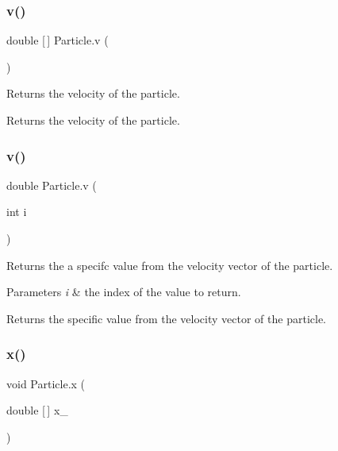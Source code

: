 \subsubsection{\texorpdfstring{v()}{v()}\hspace{0.1cm}{\footnotesize\ttfamily [2/3]}}
{\footnotesize\ttfamily double \mbox{[}$\,$\mbox{]} Particle.\+v (\begin{DoxyParamCaption}{ }\end{DoxyParamCaption})}

Returns the velocity of the particle. \begin{DoxyReturn}{Returns}
the velocity of the particle. 
\end{DoxyReturn}
\mbox{\label{class_particle_aa7e430520821b6650d829f3b51752d01}} 
\subsubsection{\texorpdfstring{v()}{v()}\hspace{0.1cm}{\footnotesize\ttfamily [3/3]}}
{\footnotesize\ttfamily double Particle.\+v (\begin{DoxyParamCaption}\item[{int}]{i }\end{DoxyParamCaption})}

Returns the a specifc value from the velocity vector of the particle. 
\begin{DoxyParams}{Parameters}
{\em i} & the index of the value to return. \\
\hline
\end{DoxyParams}
\begin{DoxyReturn}{Returns}
the specific value from the velocity vector of the particle. 
\end{DoxyReturn}
\mbox{\label{class_particle_a9de71f4a28c9c9716b0dce34bd8e2aa9}} 
\subsubsection{\texorpdfstring{x()}{x()}\hspace{0.1cm}{\footnotesize\ttfamily [1/3]}}
{\footnotesize\ttfamily void Particle.\+x (\begin{DoxyParamCaption}\item[{double \mbox{[}$\,$\mbox{]}}]{x\+\_\+ }\end{DoxyParamCaption})}

